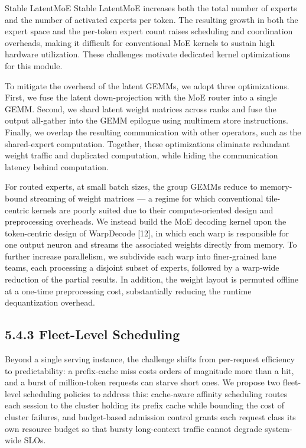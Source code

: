 \documentclass[
  10
]{article}
\begin{document}
Stable LatentMoE Stable LatentMoE increases both the total number of
experts and the number of activated experts per token. The resulting
growth in both the expert space and the per-token expert count raises
scheduling and coordination overheads, making it difficult for
conventional MoE kernels to sustain high hardware utilization. These
challenges motivate dedicated kernel optimizations for this module.

To mitigate the overhead of the latent GEMMs, we adopt three
optimizations. First, we fuse the latent down-projection with the MoE
router into a single GEMM. Second, we shard latent weight matrices
across ranks and fuse the output all-gather into the GEMM epilogue using
multimem store instructions. Finally, we overlap the resulting
communication with other operators, such as the shared-expert
computation. Together, these optimizations eliminate redundant weight
traffic and duplicated computation, while hiding the communication
latency behind computation.

For routed experts, at small batch sizes, the group GEMMs reduce to
memory-bound streaming of weight matrices --- a regime for which
conventional tile-centric kernels are poorly suited due to their
compute-oriented design and preprocessing overheads. We instead build
the MoE decoding kernel upon the token-centric design of WarpDecode
{[}12{]}, in which each warp is responsible for one output neuron and
streams the associated weights directly from memory. To further increase
parallelism, we subdivide each warp into finer-grained lane teams, each
processing a disjoint subset of experts, followed by a warp-wide
reduction of the partial results. In addition, the weight layout is
permuted offline at a one-time preprocessing cost, substantially
reducing the runtime dequantization overhead.

\subsection{5.4.3 Fleet-Level Scheduling}\label{fleet-level-scheduling}

Beyond a single serving instance, the challenge shifts from per-request
efficiency to predictability: a prefix-cache miss costs orders of
magnitude more than a hit, and a burst of million-token requests can
starve short ones. We propose two fleet-level scheduling policies to
address this: cache-aware affinity scheduling routes each session to the
cluster holding its prefix cache while bounding the cost of cluster
failures, and budget-based admission control grants each request class
its own resource budget so that bursty long-context traffic cannot
degrade system-wide SLOs.
\end{document}
